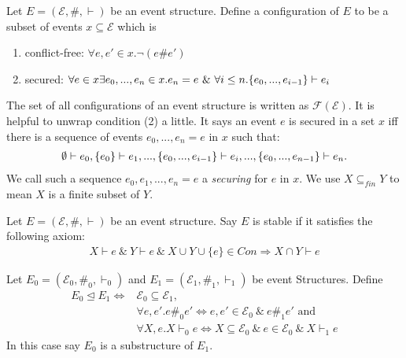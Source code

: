 \documentclass{article}
\begin{document}
\begin{definition}[Configuration]
Let $E = (\mathcal{E},\#,\vdash)$ be an event structure. 
Define a configuration of $E$ to be a subset of events $x \subseteq \mathcal{E}$ which is
\begin{enumerate}
    \item conflict-free: $\forall e,e' \in x.\neg{(e\#e')}$
    \item secured: $\forall e \in x \exists e_0,...,e_n \in x. e_n = e \ \& \
    \forall i \leq n. \{e_0,...,e_{i-1}\} \vdash e_i$
\end{enumerate}
\end{definition}
The set of all configurations of an event structure is written as $\mathcal{F(E)}$.
It is helpful to unwrap condition (2) a little. It says an event $e$ is secured in a set $x$
iff there is a sequence of events $e_0,...,e_n = e$ in $x$ such that:
\begin{align*}
    \emptyset \vdash e_0, \{e_0\} \vdash e_1, ..., \{e_0,...,e_{i-1}\} \vdash e_i,...,
    \{e_0,...,e_{n-1}\} \vdash e_n.
\end{align*}
We call such a sequence $e_0,e_1,...,e_n = e$ a \emph{securing} for $e$ in $x$.
We use $X \subseteq_{fin} Y$ to mean $X$ is a finite subset of $Y$.

\begin{definition}
Let $E = (\mathcal{E},\#,\vdash)$ be an event structure. Say $E$ is stable if it satisfies the following axiom:
\begin{align*}
    X \vdash e \ \& \ Y \vdash e \ \& \ X \cup Y \cup \{e\} \in Con \Rightarrow X \cap Y \vdash e
\end{align*}
\end{definition}

\begin{definition}
Let $E_0 = (\mathcal{E}_0,\#_0,\vdash_0)$ and $E_1 = (\mathcal{E}_1,\#_1,\vdash_1)$ 
be event Structures. Define 
\begin{align*}
    E_0 \trianglelefteq E_1 \iff & \mathcal{E}_0 \subseteq \mathcal{E}_1, \\
        & \forall e,e'. e\#_0e'  \iff e,e' \in \mathcal{E}_0 \ \& \ e\#_1 e' \text{ and }  \\
        & \forall X,e.X\vdash_0 e  \iff X \subseteq \mathcal{E}_0 
        \ \& \ e \in \mathcal{E}_0\ \& \ X \vdash_1 e
\end{align*}
In this case say $E_0$ is a substructure of $E_1$.
\end{definition}
\end{document}
